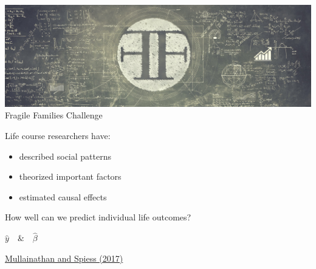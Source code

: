 \documentclass[aspectratio=169]{beamer}
\begin{document}
\begin{frame}

\begin{center}
\includegraphics[width=\textwidth]{figures/ffc_masthead}
\Large{Fragile Families Challenge}
\end{center}

\end{frame}
\begin{frame}

Life course researchers have:
\begin{itemize}
\item described social patterns
\item theorized important factors
\item estimated causal effects
\end{itemize}

\pause
\vfill
How well can we predict individual life outcomes?

\end{frame}
\begin{frame}

\begin{center}
\LARGE{
$ \hat{y} \quad \& \quad \hat{\beta}$
}
\end{center}

\vfill
\href{https://dx.doi.org/10.1257/jep.31.2.87}{Mullainathan and Spiess (2017)}
\end{frame}
\end{document}

